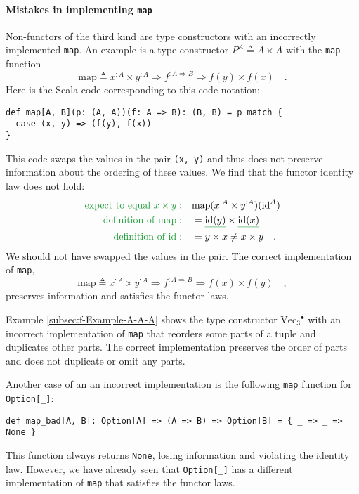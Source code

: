 \paragraph{Mistakes in implementing \lstinline!map!}

Non-functors of the third kind are type constructors with an incorrectly
implemented \lstinline!map!. An example is a type constructor $P^{A}\triangleq A\times A$
with the \lstinline!map! function
\[
\text{map}\triangleq x^{:A}\times y^{:A}\Rightarrow f^{:A\Rightarrow B}\Rightarrow f(y)\times f(x)\quad.
\]
Here is the Scala code corresponding to this code notation:
\begin{lstlisting}
def map[A, B](p: (A, A))(f: A => B): (B, B) = p match {
  case (x, y) => (f(y), f(x))
}
\end{lstlisting}
This code swaps the values in the pair \lstinline!(x, y)! and thus
does not preserve information about the ordering of these values.
We find that the functor identity law does not hold:
\begin{align*}
{\color{greenunder}\text{expect to equal }x\times y:}\quad & \text{map}(x^{:A}\times y^{:A})(\text{id}^{A})\\
{\color{greenunder}\text{definition of }\text{map}:}\quad & =\gunderline{\text{id}(y)}\times\gunderline{\text{id}(x)}\\
{\color{greenunder}\text{definition of }\text{id}:}\quad & =y\times x\neq x\times y\quad.
\end{align*}
We should not have swapped the values in the pair. The correct implementation
of \lstinline!map!,
\[
\text{map}\triangleq x^{:A}\times y^{:A}\Rightarrow f^{:A\Rightarrow B}\Rightarrow f(x)\times f(y)\quad,
\]
preserves information and satisfies the functor laws.

Example \ref{subsec:f-Example-A-A-A} shows the type constructor $\text{Vec}_{3}{}^{\bullet}$
with an incorrect implementation of \lstinline!map! that reorders
some parts of a tuple and duplicates other parts. The correct implementation
preserves the order of parts and does not duplicate or omit any parts.

Another case of an an incorrect implementation is the following \lstinline!map!
function for \lstinline!Option[_]!:
\begin{lstlisting}
def map_bad[A, B]: Option[A] => (A => B) => Option[B] = { _ => _ => None }
\end{lstlisting}
This function always returns \lstinline!None!, losing information
and violating the identity law. However, we have already seen that
\lstinline!Option[_]! has a different implementation of \lstinline!map!
that satisfies the functor laws.

